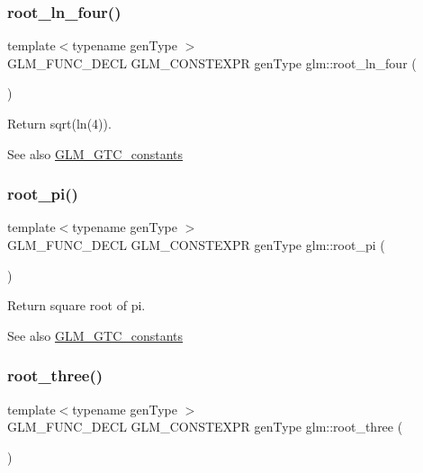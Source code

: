 \subsubsection{\texorpdfstring{root\+\_\+ln\+\_\+four()}{root\_ln\_four()}}
{\footnotesize\ttfamily template$<$typename gen\+Type $>$ \\
G\+L\+M\+\_\+\+F\+U\+N\+C\+\_\+\+D\+E\+CL G\+L\+M\+\_\+\+C\+O\+N\+S\+T\+E\+X\+PR gen\+Type glm\+::root\+\_\+ln\+\_\+four (\begin{DoxyParamCaption}{ }\end{DoxyParamCaption})}

Return sqrt(ln(4)). \begin{DoxySeeAlso}{See also}
\hyperlink{group__gtc__constants}{G\+L\+M\+\_\+\+G\+T\+C\+\_\+constants} 
\end{DoxySeeAlso}
\mbox{\label{group__gtc__constants_ga261380796b2cd496f68d2cf1d08b8eb9}} 
\subsubsection{\texorpdfstring{root\+\_\+pi()}{root\_pi()}}
{\footnotesize\ttfamily template$<$typename gen\+Type $>$ \\
G\+L\+M\+\_\+\+F\+U\+N\+C\+\_\+\+D\+E\+CL G\+L\+M\+\_\+\+C\+O\+N\+S\+T\+E\+X\+PR gen\+Type glm\+::root\+\_\+pi (\begin{DoxyParamCaption}{ }\end{DoxyParamCaption})}

Return square root of pi. \begin{DoxySeeAlso}{See also}
\hyperlink{group__gtc__constants}{G\+L\+M\+\_\+\+G\+T\+C\+\_\+constants} 
\end{DoxySeeAlso}
\mbox{\label{group__gtc__constants_ga4f286be4abe88be1eed7d2a9f6cb193e}} 
\subsubsection{\texorpdfstring{root\+\_\+three()}{root\_three()}}
{\footnotesize\ttfamily template$<$typename gen\+Type $>$ \\
G\+L\+M\+\_\+\+F\+U\+N\+C\+\_\+\+D\+E\+CL G\+L\+M\+\_\+\+C\+O\+N\+S\+T\+E\+X\+PR gen\+Type glm\+::root\+\_\+three (\begin{DoxyParamCaption}{ }\end{DoxyParamCaption})}

